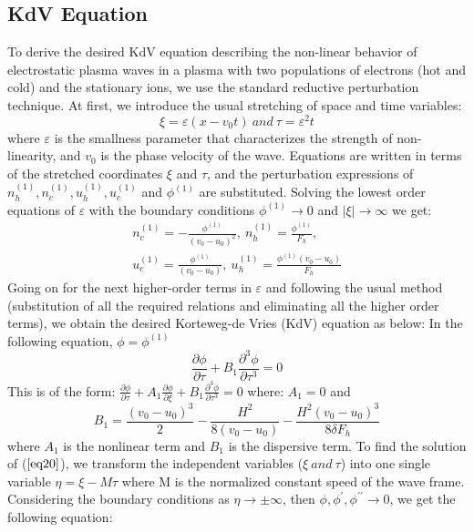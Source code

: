 \documentclass[journal]{IEEEtran}
\begin{document}
\subsection{KdV Equation}\label{2}

To derive the desired KdV equation describing the non-linear behavior of electrostatic plasma waves in a plasma with two populations of electrons (hot and cold) and the stationary ions, we use the standard reductive perturbation technique. At first, we introduce the usual stretching of space and time variables:
\begin{equation}\label{eq18}
\xi=\varepsilon(x-v_0t) \ and \ \tau={\varepsilon}^2t
\end{equation}
where $\varepsilon$ is the smallness parameter that characterizes the strength of non-linearity, and $v_0$ is the phase velocity of the wave. Equations are written in terms of the stretched coordinates $\xi$ and $\tau$, and the perturbation expressions of  $n_{h}^{(1)}, n_{c}^{(1)}, u_{h}^{(1)}, u_{c}^{(1)}$ and $\phi^{(1)}$ are substituted. Solving the lowest order equations of $\varepsilon$ with the boundary conditions $\phi^{(1)}\rightarrow 0$ and $\mid \xi \mid \rightarrow \infty$ we get:
\begin{multline}\label{eq19}
n_{c}^{(1)}=-\frac{\phi^{(1)}}{(v_0-u_0)^2}, \ n_{h}^{(1)}=\frac{\phi^{(1)}}{F_h},\\
u_{c}^{(1)}=\frac{\phi^{(1)}}{(v_0-u_0)}, \ u_{h}^{(1)}=\frac{\phi^{(1)}(v_0-u_0)}{F_{h}}
\end{multline}
Going on for the next higher-order terms in $\varepsilon$ and following the usual method (substitution of all the required relations and eliminating all the higher order terms), we obtain the desired Korteweg-de Vries (KdV) equation as below:
In the following equation, $\phi=\phi^{(1)}$
\begin{equation}\label{eq20}
\frac{\partial \phi}{\partial \tau}+B_1{\frac{\partial^3 \phi}{\partial \tau^3}}=0
\end{equation}
This is of the form:
$\frac{\partial \phi}{\partial \tau}+A_1{\frac{\partial \phi}{\partial \xi}}+B_1{\frac{\partial^3 \phi}{\partial \tau^3}}=0$
where:
$A_1=0$ and 
\begin{equation}\label{eq21}
B_1=\frac{(v_0-u_0)^3}{2}-\frac{H^2}{8(v_0-u_0)}-\frac{H^2(v_0-u_0)^3}{8\delta F_h}
\end{equation}
where $A_1$ is the nonlinear term and $B_1$ is the dispersive term. 
To find the solution of ($\ref{eq20}$), we transform the independent variables ($\xi \ and \ \tau$) into one single variable $\eta=\xi-M\tau$ where M is the normalized constant speed of the wave frame. Considering the boundary conditions as $\eta\rightarrow \pm \infty$, then $\phi, \phi^{\prime},\phi^{\prime\prime}\rightarrow 0$, we get the following equation:
\end{document}
